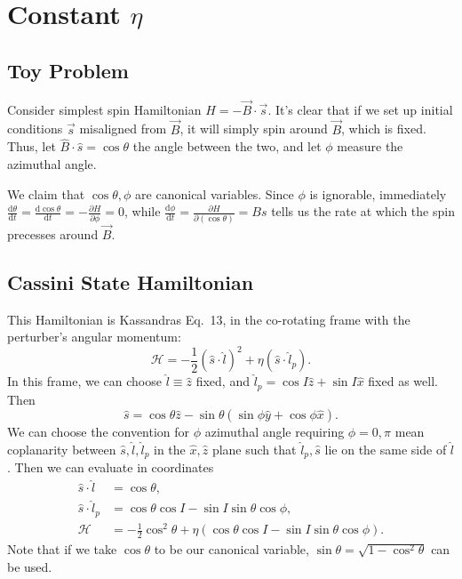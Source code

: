 \documentclass[11pt,
        usenames, %
        dvipsnames %
    ]{article}
\newcommand*{\rd}[2]{\frac{\mathrm{d}#1}{\mathrm{d}#2}}
\newcommand*{\pd}[2]{\frac{\partial#1}{\partial#2}}
\newcommand*{\p}[1]{\left(#1\right)}
\begin{document}
\def\Snospace~{\S{}} %
\renewcommand*{\sectionautorefname}{\Snospace}
\renewcommand*{\appendixautorefname}{\Snospace}
\renewcommand*{\figureautorefname}{Fig.}
\renewcommand*{\equationautorefname}{Eq.}
\renewcommand*{\tableautorefname}{Tab.}

\section{Constant $\eta$}

\subsection{Toy Problem}

Consider simplest spin Hamiltonian $H = -\vec{B} \cdot \vec{s}$. It's clear that
if we set up initial conditions $\vec{s}$ misaligned from $\vec{B}$, it will
simply spin around $\vec{B}$, which is fixed. Thus, let $\hat{B} \cdot \hat{s} =
\cos \theta$ the angle between the two, and let $\phi$ measure the azimuthal
angle.

We claim that $\cos \theta, \phi$ are canonical variables. Since $\phi$ is
ignorable, immediately $\rd{\theta}{t} = \rd{\cos \theta}{t} = -\pd{H}{\phi} =
0$, while $\rd{\phi}{t} = \pd{H}{(\cos \theta)} = Bs$ tells us the rate at which
the spin precesses around $\vec{B}$.

\subsection{Cassini State Hamiltonian}

This Hamiltonian is Kassandras Eq.\ 13, in the co-rotating frame with the
perturber's angular momentum:
\begin{equation}
    \mathcal{H} = -\frac{1}{2}\p{\hat{s} \cdot \hat{l}}^2
        + \eta \p{\hat{s} \cdot \hat{l}_p}.
\end{equation}
In this frame, we can choose $\hat{l} \equiv \hat{z}$ fixed, and $\hat{l}_p =
\cos I\hat{z} + \sin I\hat{x}$ fixed as well. Then
\begin{equation*}
    \hat{s} = \cos\theta \hat{z}
        - \sin\theta\p{\sin \phi \hat{y} + \cos \phi \hat{x}}.
\end{equation*}
We can choose the convention for $\phi$ azimuthal angle requiring $\phi =
0, \pi$ mean coplanarity between $\hat{s}, \hat{l}, \hat{l}_p$ in the $\hat{x},
\hat{z}$ plane such that $\hat{l}_p, \hat{s}$ lie on the same side of
$\hat{l}$. Then we can evaluate in coordinates
\begin{align*}
    \hat{s} \cdot \hat{l} &= \cos \theta,\\
    \hat{s} \cdot \hat{l}_p
        &= \cos \theta \cos I - \sin I \sin \theta \cos \phi,\\
    \mathcal{H} &= -\frac{1}{2}\cos^2\theta
        + \eta \p{\cos \theta \cos I - \sin I \sin \theta \cos \phi}.
\end{align*}
Note that if we take $\cos\theta$ to be our canonical variable, $\sin\theta =
\sqrt{1 - \cos^2\theta}$ can be used.
\end{document}

